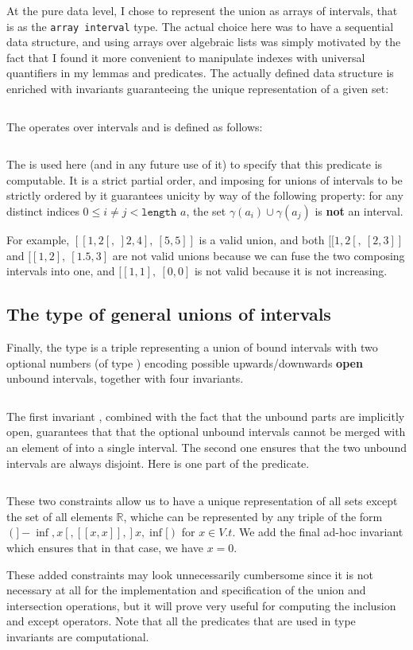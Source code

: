 At the pure data level, I chose to represent the union as arrays of intervals, that
is as the \texttt{array interval} type.
%
The actual choice here was to have a sequential data structure, and using
arrays over algebraic lists was simply motivated by the fact that I found it more
convenient to manipulate indexes with universal quantifiers in my lemmas and predicates.
%
The actually defined data structure is enriched with invariants guaranteeing the
unique representation of a given set:
%
\inputminted{\whyml}{why3code/bound_union_type.mlw}
The \minline{(<<)} operates over intervals and is defined as follows:
%
\inputminted{\whyml}{why3code/before_interval_pred.mlw}
%
The  is used here (and in any future use of it) to specify that this
predicate is computable.
%
It is a strict partial order, and imposing for unions of intervals to be strictly
ordered by it guarantees unicity by way of the following property: for any distinct
indices $0 \le i \neq j < \texttt{length } a$, the set $\gamma(a_i) \cup \gamma(a_j)$
is \textbf{not} an interval.

For example, $[[1, 2[,~]2, 4],~[5, 5]]$ is a valid union, and both
$[[1, 2[,~[2, 3]]$ and $[[1, 2],~[1.5, 3]$ are not valid unions because we
can fuse the two composing intervals into one, and $[[1, 1],~[0,0]$ is not valid
because it is not increasing.

\subsection{The type of general unions of intervals}
Finally, the type  is a triple representing a union of bound intervals
with two optional numbers (of type ) encoding possible
upwards/downwards \textbf{open} unbound intervals, together with four invariants.
%
\inputminted{\whyml}{why3code/u_type.mlw}
%
The first invariant , combined with the fact that the
unbound parts are implicitly open, guarantees that that the optional unbound
intervals cannot be merged with an element of  into a single interval.
The second one  ensures that the two unbound intervals
are always disjoint. Here is one part of the  predicate.
%
\inputminted{\whyml}{why3code/bound_unbound_disj_pred.mlw}
%
These two constraints allow us to have a unique representation of all sets except the
set of all elements $\mathbb{R}$, whiche can be represented by any triple of the
form $(]-\inf, x[, [[x,x]], ]x, \inf[)$ for $x\in V.t$.
%
We add the final ad-hoc invariant  which ensures that in
that case, we have $x = 0$.

These added constraints may look unnecessarily cumbersome since it is not necessary at
all for the implementation and specification of the union and intersection
operations, but it will prove very useful for computing the inclusion and except
operators.
%
Note that all the predicates that are used in type invariants are
computational.
